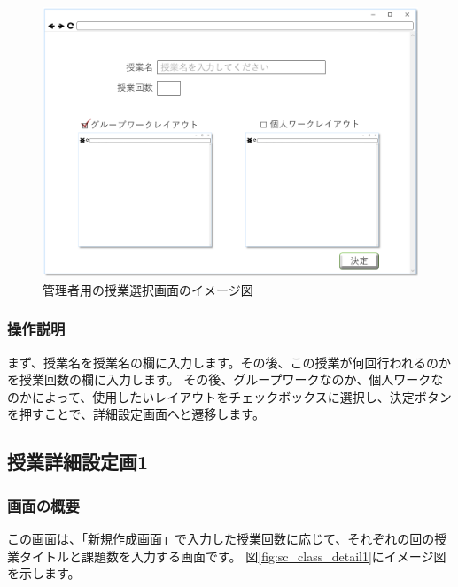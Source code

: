 \begin{figure}[htbp]
  \begin{center}
    \includegraphics[width=1\linewidth,clip]{./img/sc_class_creat1.png}
    \caption{管理者用の授業選択画面のイメージ図}\label{fig:sc_class_creat1}
  \end{center}
\end{figure}

\subsubsection{操作説明}
まず、授業名を授業名の欄に入力します。その後、この授業が何回行われるのかを授業回数の欄に入力します。
その後、グループワークなのか、個人ワークなのかによって、使用したいレイアウトをチェックボックスに選択し、決定ボタンを押すことで、詳細設定画面へと遷移します。

\newpage

\subsection{授業詳細設定画1}
\subsubsection{画面の概要}
この画面は、「新規作成画面」で入力した授業回数に応じて、それぞれの回の授業タイトルと課題数を入力する画面です。
図\ref{fig:sc_class_detail1}にイメージ図を示します。

